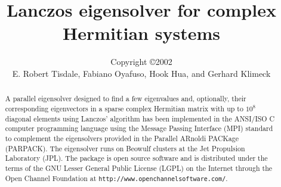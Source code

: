\documentclass[twoside,12pt]{article}
\title{Lanczos eigensolver for complex Hermitian systems}
\author{Copyright \copyright 2002\\
E. Robert Tisdale, Fabiano Oyafuso, Hook Hua, and Gerhard Klimeck}
\begin{document}

\maketitle

\begin{abstract}
A parallel eigensolver designed to find a few eigenvalues and, optionally,
their corresponding eigenvectors in a sparse complex Hermitian matrix
with up to $10^{8}$ diagonal elements using Lanczos' algorithm
has been implemented in the ANSI/ISO C computer programming language
using the Message Passing Interface (MPI) standard to complement
the eigensolvers provided in the Parallel ARnoldi PACKage (PARPACK).
The eigensolver runs on Beowulf clusters at the 
Jet Propulsion Laboratory (JPL).
The package is open source software and is distributed
under the terms of the GNU Lesser General Public License (LGPL)
on the Internet through the Open Channel Foundation at
{\tt http://www.openchannelsoftware.com/}.
\end{abstract}
\end{document}
